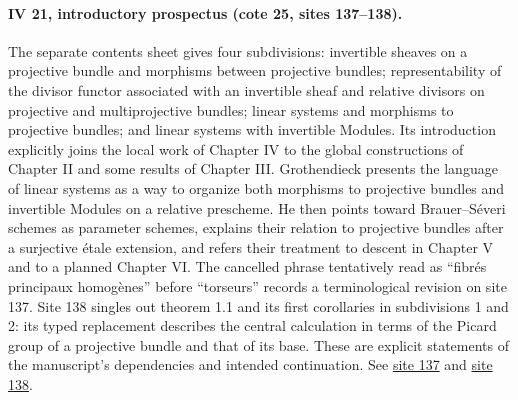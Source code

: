 \paragraph{IV 21, introductory prospectus (cote 25, sites 137--138).}
The separate contents sheet gives four subdivisions: invertible sheaves on a projective bundle and morphisms between projective bundles; representability of the divisor functor associated with an invertible sheaf and relative divisors on projective and multiprojective bundles; linear systems and morphisms to projective bundles; and linear systems with invertible Modules. Its introduction explicitly joins the local work of Chapter IV to the global constructions of Chapter II and some results of Chapter III. Grothendieck presents the language of linear systems as a way to organize both morphisms to projective bundles and invertible Modules on a relative prescheme. He then points toward Brauer--Séveri schemes as parameter schemes, explains their relation to projective bundles after a surjective étale extension, and refers their treatment to descent in Chapter V and to a planned Chapter VI. The cancelled phrase tentatively read as ``fibrés principaux homogènes'' before ``torseurs'' records a terminological revision on site 137. Site 138 singles out theorem 1.1 and its first corollaries in subdivisions 1 and 2: its typed replacement describes the central calculation in terms of the Picard group of a projective bundle and that of its base. These are explicit statements of the manuscript's dependencies and intended continuation. See \href{https://grothendieck.umontpellier.fr/web/viewer.html?file=../25.pdf#page=138}{site 137} and \href{https://grothendieck.umontpellier.fr/web/viewer.html?file=../25.pdf#page=139}{site 138}.
